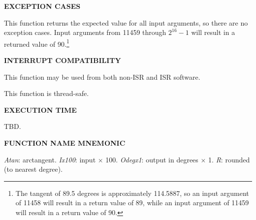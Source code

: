 \noindent\textbf{EXCEPTION CASES}
\begin{list}{}{\setlength{\leftmargin}{0.25in}\setlength{\topsep}{0.0in}}
\item This function returns the expected value for all input arguments,
      so there are no exception cases.
      Input arguments from 11459 through $2^{16}-1$ will result
      in a returned value of 90.\footnote{The tangent of 89.5 degrees is approximately 114.5887,
      so an input argument of 11458 will result in a return value of 89, while an
      input argument of 11459 will result in a return value of 90.}
\end{list}
\vspace{2.8ex}

\noindent\textbf{INTERRUPT COMPATIBILITY}
\begin{list}{}{\setlength{\leftmargin}{0.25in}\setlength{\topsep}{0.0in}}
\item This function may be used from both non-ISR and ISR software.
\item This function is thread-safe.
\end{list}
\vspace{2.8ex}

\noindent\textbf{EXECUTION TIME}
\begin{list}{}{\setlength{\leftmargin}{0.25in}\setlength{\topsep}{0.0in}}
\item TBD.
\end{list}
\vspace{2.8ex}

\noindent\textbf{FUNCTION NAME MNEMONIC}
\begin{list}{}{\setlength{\leftmargin}{0.25in}\setlength{\topsep}{0.0in}}
\item \emph{Atan}:       arctangent.
      \emph{Ix100}:      input $\times$ 100.
      \emph{Odegx1}:     output in degrees $\times$ 1.
      \emph{R}:          rounded (to nearest degree).
\end{list}


